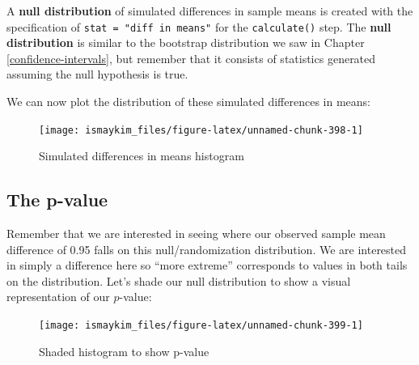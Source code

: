 \documentclass[12pt,]{krantz}
\makeatletter
\newenvironment{Shaded}{\begin{snugshade}}{\end{snugshade}}
\newcommand{\KeywordTok}[1]{\textcolor[rgb]{0.27,0.27,0.27}{\textbf{#1}}}
\newcommand{\DataTypeTok}[1]{\textcolor[rgb]{0.27,0.27,0.27}{#1}}
\newcommand{\StringTok}[1]{\textcolor[rgb]{0.5,0.5,0.5}{#1}}
\newcommand{\OperatorTok}[1]{\textcolor[rgb]{0.43,0.43,0.43}{\textbf{#1}}}
\newcommand{\NormalTok}[1]{#1}
\newenvironment{kframe}{%
\medskip{}
\setlength{\fboxsep}{.8em}
 \def\at@end@of@kframe{}%
 \ifinner\ifhmode%
  \def\at@end@of@kframe{\end{minipage}}%
  \begin{minipage}{\columnwidth}%
 \fi\fi%
 \def\FrameCommand##1{\hskip\@totalleftmargin \hskip-\fboxsep
 \colorbox{shadecolor}{##1}\hskip-\fboxsep
     \hskip-\linewidth \hskip-\@totalleftmargin \hskip\columnwidth}%
 \MakeFramed {\advance\hsize-\width
   \@totalleftmargin\z@ \linewidth\hsize
   \@setminipage}}%
 {\par\unskip\endMakeFramed%
 \at@end@of@kframe}
\renewenvironment{Shaded}{\begin{kframe}}{\end{kframe}}
\theoremstyle{definition}
\theoremstyle{definition}
\theoremstyle{definition}
\theoremstyle{remark}
\makeatother
\begin{document}
A \textbf{null distribution} of simulated differences in sample means is
created with the specification of \texttt{stat\ =\ "diff\ in\ means"}
for the \texttt{calculate()} step. The \textbf{null distribution} is
similar to the bootstrap distribution we saw in Chapter
\ref{confidence-intervals}, but remember that it consists of statistics
generated assuming the null hypothesis is true.

We can now plot the distribution of these simulated differences in
means:

\begin{Shaded}
\end{Shaded}

\begin{figure}

{\centering \texttt{[image: ismaykim\_files/figure-latex/unnamed-chunk-398-1]} 

}

\caption{Simulated differences in means histogram}\label{fig:unnamed-chunk-398}
\end{figure}

\subsection{The p-value}\label{the-p-value}

Remember that we are interested in seeing where our observed sample mean
difference of 0.95 falls on this null/randomization distribution. We are
interested in simply a difference here so ``more extreme'' corresponds
to values in both tails on the distribution. Let's shade our null
distribution to show a visual representation of our \(p\)-value:

\begin{Shaded}
\end{Shaded}

\begin{figure}

{\centering \texttt{[image: ismaykim\_files/figure-latex/unnamed-chunk-399-1]} 

}

\caption{Shaded histogram to show p-value}\label{fig:unnamed-chunk-399}
\end{figure}
\end{document}

